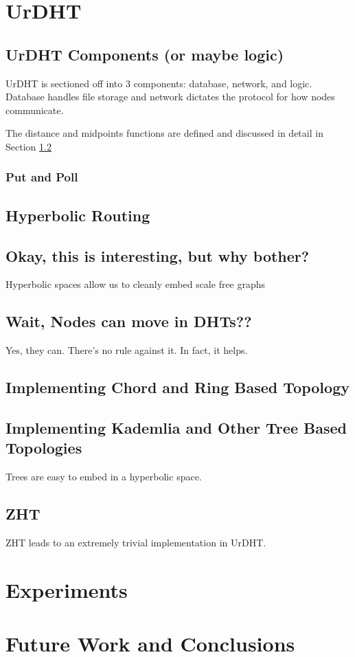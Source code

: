 \documentclass[11pt,conference]{IEEEtran}
\begin{document}
\section{UrDHT}
\label{sec:urdht}
	\subsection{UrDHT Components (or maybe logic)}
	
	UrDHT is sectioned off into 3 components: database, network, and logic.
	Database handles file storage and network dictates the protocol for how nodes communicate.
	
	The distance and midpoints functions are defined and discussed in detail in Section \ref{sec:hyper}
	
	\subsubsection{Put and Poll}
	\subsection{Hyperbolic Routing}
	\label{sec:hyper}
	
	\subsection{Okay, this is interesting, but why bother?}
	
	Hyperbolic spaces allow us to cleanly embed scale free graphs
	
	\subsection{Wait, Nodes can move in DHTs??}
	Yes, they can.  
	There's no rule against it. 
	In fact, it helps.
	
	\subsection{Implementing Chord and Ring Based Topology}
	
	
	\subsection{Implementing Kademlia and Other Tree Based Topologies}
	Trees are easy to embed in a hyperbolic space.
	\subsection{ZHT}
	ZHT leads to an extremely trivial implementation in UrDHT.
	
\section{Experiments}
\label{sec:experiments}

\section{Future Work and Conclusions}
\label{sec:future}



\end{document}
